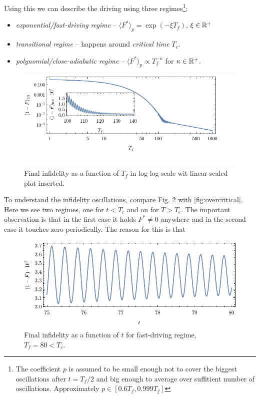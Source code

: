 Using this we can describe the driving using three regimes\footnote{The coefficient $p$ is assumed to be small enough not to cover the biggest oscillations after $t=T_f/2$ and big enough to average over suffitient number of oscillations. Approximately $p\in[0.6T_f,0.999T_f]$}:
\begin{itemize}
    \item \emph{exponential/fast-driving regime} -- $\langle F^*\rangle_p= \exp(-\xi T_f)$, $\xi\in\mathbb{R}^+$
    \item \emph{transitional regime} -- happens around \emph{critical time} $T_c$.
    \item \emph{polynomial/close-adiabatic regime} -- $\langle F^*\rangle_p\propto T_f^{-\kappa}$ for $\kappa\in \mathbb{R}^+$.
\end{itemize}

\begin{figure}[H]
    \centering
    \includegraphics[scale=1.2]{../img/infidCombined1.pdf}
    \caption{Final infidelity as a function of $T_f$ in log log scale wit linear scaled plot inserted.}
    \label{fig:infidCombined}
\end{figure}


To understand the infidelity oscillations, compare Fig. \ref{fig:undercritical} with \ref{fig:overcritical}. Here we see two regimes, one for $t<T_c$ and on for $T>T_c$. The important observation is that in the first case it holds $F^*\neq 0$ anywhere and in the second case it touches zero periodically. The reason for this is that   

\begin{figure}[H]
    \centering
    \includegraphics[scale=1.2]{../img/undercritical.pdf}
    \caption{Final infidelity as a function of $t$ for fast-driving regime, $T_f=80<T_c$.}
    \label{fig:undercritical}
\end{figure}

